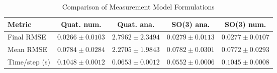 \begin{table}[htbp]
\centering
\caption{Comparison of Measurement Model Formulations}
\label{tab:method_comparison}
\begin{tabular}{lcccc}
\hline
Metric & Quat. num. & Quat. ana. & SO(3) ana. & SO(3) num. \\
\hline
Final RMSE & $0.0266 \pm 0.0103$ & $2.7962 \pm 2.3494$ & $0.0279 \pm 0.0113$ & $0.0277 \pm 0.0107$ \\
Mean RMSE & $0.0784 \pm 0.0284$ & $2.2705 \pm 1.9843$ & $0.0782 \pm 0.0301$ & $0.0772 \pm 0.0293$ \\
Time/step (s) & $0.1048 \pm 0.0012$ & $0.0653 \pm 0.0012$ & $0.0552 \pm 0.0006$ & $0.1045 \pm 0.0008$ \\
\hline
\end{tabular}
\end{table}
